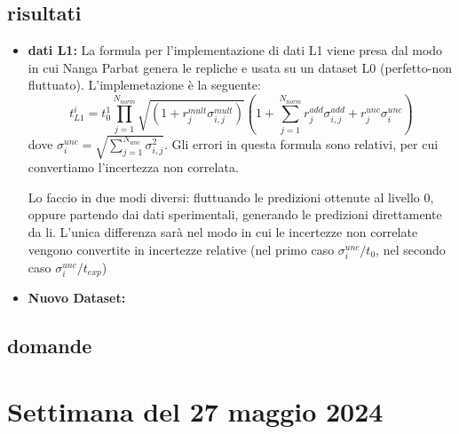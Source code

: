 \documentclass{article}
\begin{document}
\subsection{risultati}
\begin{itemize}
    \item \textbf{ dati L1: } La formula per l'implementazione di dati L1 viene presa dal modo in cui Nanga Parbat genera le repliche e usata su un dataset L0 (perfetto-non fluttuato). L'implemetazione è la seguente:
    \[
    t_{L1}^i = t_0^1 \prod_{j=1}^{N_{norm}} \sqrt{(1 + r^{mult}_{j} \sigma_{i, j}^{mult})} (1 + \sum_{j=1}^{N_{norm}} r^{add}_{j} \sigma_{i, j}^{add} + r^{unc}_{j} \sigma_{i}^{unc}) 
    \]
    dove $\sigma_{i}^{unc} = \sqrt{\sum_{j=1}^{N_{unc}} \sigma_{i,j}^2}$. Gli errori in questa formula sono relativi, per cui convertiamo l'incertezza non correlata. 

    Lo faccio in due modi diversi: fluttuando le predizioni ottenute al livello 0, oppure partendo dai dati sperimentali, generando le predizioni direttamente da li. L'unica differenza sarà nel  modo in cui le incertezze non correlate vengono convertite in incertezze relative (nel primo caso $\sigma_{i}^{unc}/t_0$, nel secondo caso $\sigma_{i}^{unc}/t_{exp}$)

    \item \textbf{Nuovo Dataset: } 
\end{itemize}


\subsection{domande}

\section{Settimana del 27 maggio 2024}
\end{document}
